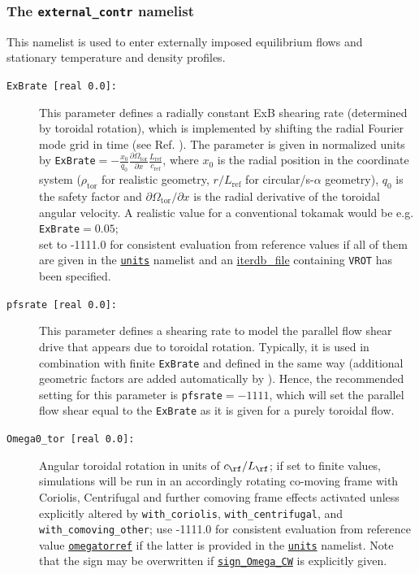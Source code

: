 \documentclass[12pt]{article}
\begin{document}
\subsubsection{The \texttt{external\_contr} namelist}
This namelist is used to enter externally imposed equilibrium flows and stationary temperature and density
profiles.
\begin{description}
\item[\texttt{ExBrate [real 0.0]:}] This parameter defines a radially constant ExB shearing rate
  (determined by toroidal rotation), which is implemented by shifting the radial Fourier mode grid in time
  (see Ref. \cite{Hammett06}). The parameter is given in normalized units by
  \texttt{ExBrate}$=-\frac{x_0}{q_0}\frac{\partial\Omega_{\mathrm{tor}}}{\partial x}\frac{L_\mathrm{ref}}{c_\mathrm{ref}}$,
  where $x_0$ is the radial position in the \gene coordinate system ($\rho_\mathrm{tor}$ for realistic geometry,
  $r/L_\mathrm{ref}$ for
  circular/s-$\alpha$ geometry), $q_0$ is the safety factor and $\partial\Omega_{\mathrm{tor}}/\partial x$
  is the radial derivative of the
  toroidal angular velocity. A realistic value for a conventional tokamak would be e.g. \texttt{ExBrate}$=0.05$;\\
  set to -1111.0 for consistent evaluation from reference values if all of them are given
  in the \hyperlink{units_nml}{\tt units} namelist and an \hyperlink{iterdb_file}{iterdb\_file} containing \texttt{VROT}
  has been specified.
\item[\texttt{pfsrate [real 0.0]:}] This parameter defines a shearing rate to model the parallel flow shear
  drive that appears due to toroidal rotation. Typically, it is used in combination with finite \texttt{ExBrate} and
  defined in the same way (additional geometric factors are added automatically by \gene).
  Hence, the recommended setting for this parameter is \texttt{pfsrate}$=-1111$, which will set the parallel flow shear
  equal to the \texttt{ExBrate} as it is given for a purely toroidal flow.
\item[\texttt{Omega0\_tor [real 0.0]:}] Angular toroidal rotation in units of $c_\rf/L_\rf$; if set to finite values,
simulations will be run in an accordingly rotating co-moving frame with Coriolis, Centrifugal and further comoving
frame effects activated unless explicitly altered by {\tt with\_coriolis}, {\tt with\_centrifugal}, and {\tt with\_comoving\_other};
use -1111.0 for consistent evaluation from reference value \hyperlink{omegatorref}{\tt omegatorref} if the latter is provided in the \hyperlink{units_nml}{\tt units} namelist. Note that the sign may be overwritten if \hyperlink{sign_Omega_CW}{\tt sign\_Omega\_CW} is explicitly given.

\end{description}
\end{document}
